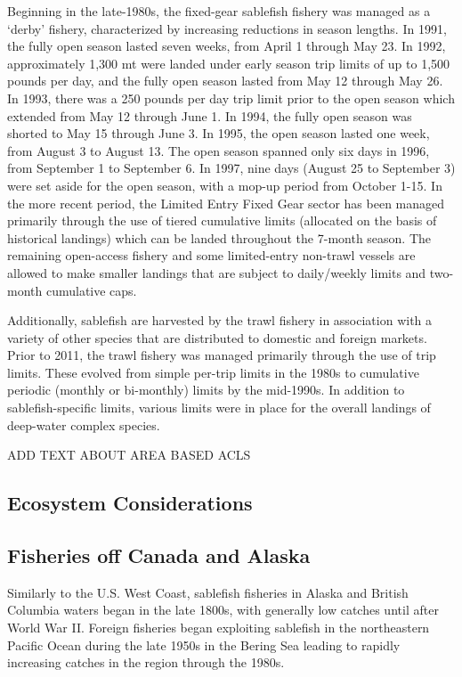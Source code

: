 \documentclass[
]{scrartcl}
\begin{document}
Beginning in the late-1980s, the fixed-gear sablefish fishery was
managed as a `derby' fishery, characterized by increasing reductions in
season lengths. In 1991, the fully open season lasted seven weeks, from
April 1 through May 23. In 1992, approximately 1,300 mt were landed
under early season trip limits of up to 1,500 pounds per day, and the
fully open season lasted from May 12 through May 26. In 1993, there was
a 250 pounds per day trip limit prior to the open season which extended
from May 12 through June 1. In 1994, the fully open season was shorted
to May 15 through June 3. In 1995, the open season lasted one week, from
August 3 to August 13. The open season spanned only six days in 1996,
from September 1 to September 6. In 1997, nine days (August 25 to
September 3) were set aside for the open season, with a mop-up period
from October 1-15. In the more recent period, the Limited Entry Fixed
Gear sector has been managed primarily through the use of tiered
cumulative limits (allocated on the basis of historical landings) which
can be landed throughout the 7-month season. The remaining open-access
fishery and some limited-entry non-trawl vessels are allowed to make
smaller landings that are subject to daily/weekly limits and two-month
cumulative caps.

Additionally, sablefish are harvested by the trawl fishery in
association with a variety of other species that are distributed to
domestic and foreign markets. Prior to 2011, the trawl fishery was
managed primarily through the use of trip limits. These evolved from
simple per-trip limits in the 1980s to cumulative periodic (monthly or
bi-monthly) limits by the mid-1990s. In addition to sablefish-specific
limits, various limits were in place for the overall landings of
deep-water complex species.

ADD TEXT ABOUT AREA BASED ACLS

\subsection{Ecosystem Considerations}\label{ecosystem-considerations}

\subsection{Fisheries off Canada and
Alaska}\label{fisheries-off-canada-and-alaska}

Similarly to the U.S. West Coast, sablefish fisheries in Alaska and
British Columbia waters began in the late 1800s, with generally low
catches until after World War II. Foreign fisheries began exploiting
sablefish in the northeastern Pacific Ocean during the late 1950s in the
Bering Sea leading to rapidly increasing catches in the region through
the 1980s.
\end{document}
